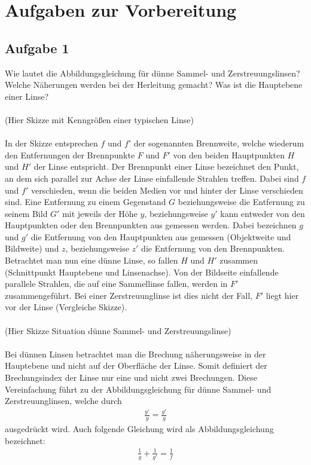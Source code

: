 \documentclass[a4paper,10pt]{scrartcl}
\begin{document}
		\newpage
		
	\section{Aufgaben zur Vorbereitung}
		\subsection{Aufgabe 1}
			Wie lautet die Abbildungsgleichung für dünne Sammel- und Zerstreuungslinsen? Welche Näherungen
			werden bei der Herleitung gemacht? Was ist die Hauptebene einer Linse?\\
			\\
			(Hier Skizze mit Kenngrößen einer typischen Linse)\\
			\\
			In der Skizze entsprechen \(f\) und \(f'\) der sogenannten Brennweite, welche wiederum den Entfernungen der Brennpunkte \(F\) und \(F'\) von den beiden Hauptpunkten \(H\) und \(H'\) der Linse entspricht. Der Brennpunkt einer Linse bezeichnet den Punkt, an dem sich parallel zur Achse der Linse einfallende Strahlen treffen. Dabei sind \(f\) und \(f'\) verschieden, wenn die beiden Medien vor und hinter der Linse verschieden sind. Eine Entfernung zu einem Gegenstand \(G\) beziehungsweise die Entfernung zu seinem Bild \(G'\) mit jeweils der Höhe \(y\), beziehungsweise \(y'\) kann entweder von den Hauptpunkten oder den Brennpunkten aus gemessen werden. Dabei bezeichnen \(g\) und \(g'\) die Entfernung von den Hauptpunkten aus gemessen (Objektweite und Bildweite) und \(z\), beziehungsweise \(z'\) die Entfernung von den Brennpunkten. Betrachtet man nun eine dünne Linse, so fallen \(H\) und \(H'\) zusammen (Schnittpunkt Hauptebene und Linsenachse). Von der Bildseite einfallende parallele Strahlen, die auf eine Sammellinse fallen, werden in \(F'\) zusammengeführt. Bei einer Zerstreuunglinse ist dies nicht der Fall, \(F'\) liegt hier vor der Linse (Vergleiche Skizze).\\
			\\
			(Hier Skizze Situation dünne Sammel- und Zerstreuungslinse)\\
			\\
			Bei dünnen Linsen betrachtet man die Brechung näherungsweise in der Hauptebene und nicht auf der Oberfläche der Linse. Somit definiert der Brechungsindex der Linse nur eine und nicht zwei Brechungen. Diese Vereinfachung führt zu der Abbildungsgleichung für dünne Sammel- und Zerstreuunglinsen, welche durch
			\begin{align*}
			\frac{y'}{y}=\frac{g'}{g}
			\end{align*}
			ausgedrückt wird. Auch folgende Gleichung wird als Abbildungsgleichung bezeichnet:
			\begin{align*}
			\frac{1}{g}+\frac{1}{g'}=\frac{1}{f}
			\end{align*}
			
\end{document}
